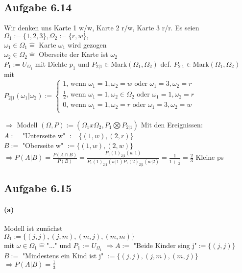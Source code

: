 \documentclass[10pt, a4paper]{article}
\begin{document}
\subsection{Aufgabe 6.14}
Wir denken uns Karte 1 w/w, Karte 2 r/w, Karte 3 r/r. Es seien $\Omega_{1}:=\{1,2,3\}, \Omega_{2}:=\{r,w\},$ \\
$ \omega_{1}\in\Omega_{1}\hat{=}$ Karte $\omega_{1}$ wird gezogen	\\
$ \omega_{2}\in\Omega_{2}\hat{=}$ Oberseite der Karte ist $\omega_{2}$ 	\\
$P_{1}:=U_{\Omega_{1}}$ mit Dichte $p_{1}$ und $P_{2|1}\in$Mark$(\Omega_{1}, \Omega_{2})$
def. $P_{2|1}\in$Mark$(\Omega_{1}, \Omega_{2})$ mit \\
$P_{2|1}(\omega_{1}|\omega_{2}):= 
\begin{cases}
	1\text{, wenn }\omega_{1}=1,\omega_{2}=w\text{ oder }\omega_{1}=3,\omega_{2}=r	\\
	\frac{1}{2}\text{, wenn }\omega_{1}=1,\omega_{2}\in\Omega_{2}\text{ oder }\omega_{1}=1,\omega_{2}=r	\\
	0\text{, wenn }\omega_{1}=1,\omega_{2}=r\text{ oder }\omega_{1}=3,\omega_{2}=w	\\
\end{cases}$

$\Rightarrow$ Modell $(\Omega,P):=(\Omega_{1}x\Omega_{2}, P_{1}\bigotimes P_{2|1})$
Mit den Ereignissen:	\\
$A:=$ "Unterseite w" $:= \{(1,w),(2,r)\}$	\\
$B:=$ "Oberseite w" $:= \{(1,w),(2,w)\}$	\\

$\Rightarrow P(A|B) = \frac{P(A\cap B)}{P(B)}=\frac{P_{1}(1)_{2|1}(w|1)}{P_{1}(1)_{2|1}(w|1)P_{1}(2)_{2|1}(w|2)} = \frac{1}{1+\frac{1}{2}} = \frac{2}{3}$
Kleine ps

\subsection{Aufgabe 6.15}
\paragraph{(a)}Modell ist zunächst \\
$\Omega_{1}:=\{(j,j),(j,m),(m,j),(m,m)\}$	\\
mit $\omega\in\Omega_{1}\hat{=}$"..." und $P_{1}:=U_{\Omega_{1}}$
$\Rightarrow A:=$ "Beide Kinder sing j"$:=\{(j,j)\}$	\\
$B:=$ "Mindestens ein Kind ist j" $:=\{(j,j),(j,m),(m,j)\}$
$\Rightarrow P(A|B)=\frac{1}{3}$
\end{document}

